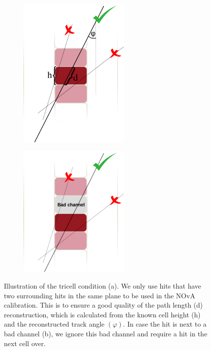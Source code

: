 \begin{figure}[hbtp]
\centering
\begin{subfigure}[b]{0.49\textwidth}
\centering
\includegraphics[width=0.6\textwidth]{Plots/NOvAExperiment/TricellConditionWithDescription.png}
\caption{}
\end{subfigure}
\begin{subfigure}[b]{0.49\textwidth}
\centering
\includegraphics[width=0.6\textwidth]{Plots/NOvAExperiment/TricellConditionWithBadChannel.png}
\caption{}
\end{subfigure}
\caption{Illustration of the tricell condition (a). We only use hits that have two surrounding hits in the same plane to be used in the NOvA calibration. This is to ensure a good quality of the path length (d) reconstruction, which is calculated from the known cell height (h) and the reconstructed track angle $\left(\varphi\right)$. In case the hit is next to a bad channel (b), we ignore this bad channel and require a hit in the next cell over.}
\label{figTricellCondition}
\end{figure}


